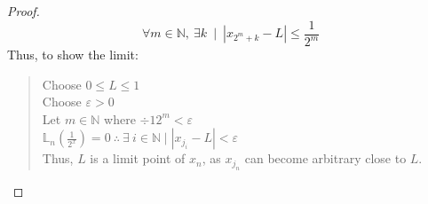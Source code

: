 \begin{proof}
    $$∀m∈ℕ,\ ∃k\ ∣\ \left|x_{2^m+k}-L\right|\le\frac{1}{2^{m}}$$
    Thus, to show the limit:
    \begin{quote}
        Choose $0≤L≤1$ \\
        Choose $ε>0$ \\
        Let $m∈ℕ$ where $÷{1}{2^m}<ε$ \\
        $𝕃_{n}\left(\frac{1}{2^{x}}\right)=0\ ∴\ ∃\ i∈ℕ ∣ \left|x_{j_i}-L\right|<ε$ \\
        Thus, $L$ is a limit point of $x_n$, as $x_{j_n}$ can become arbitrary close to $L$.
    \end{quote}
\end{proof}
